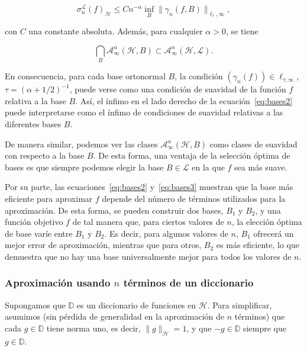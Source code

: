 \begin{equation}\label{eq:bases2}
    \sigma_n^{\mathcal{L}}(f)_{\mathcal{H}} \leq C n^{-\alpha} \inf_{B} \| \gamma_n(f, B) \|_{\ell_r, \infty},
\end{equation}

con $C$ una constante absoluta. Además, para cualquier $\alpha > 0$, se tiene

\begin{equation}\label{eq:bases3}
    \bigcap_{B} \mathcal{A}_\infty^\alpha (\mathcal{H}, B) \subset \mathcal{A}_\infty^\alpha (\mathcal{H}, \mathcal{L}).
\end{equation}

En consecuencia, para cada base ortonormal $B$, la condición $(\gamma_n(f)) \in \ell_{\tau, \infty}$, $\tau = (\alpha + 1/2)^{-1}$, puede verse como una condición de suavidad de la función $f$ relativa a la base $B$. Así, el ínfimo en el lado derecho de la ecuación~\eqref{eq:bases2} puede interpretarse como el ínfimo de condiciones de suavidad relativas a las diferentes bases $B$.

De manera similar, podemos ver las clases $\mathcal{A}_\infty^\alpha (\mathcal{H}, B)$ como clases de suavidad con respecto a la base $B$. De esta forma, una ventaja de la selección óptima de bases es que siempre podemos elegir la base $B \in \mathcal{L}$ en la que $f$ sea más suave.

Por su parte, las ecuaciones~\eqref{eq:bases2} y~\eqref{eq:bases3} muestran que la base más eficiente para aproximar $f$ depende del número de términos utilizados para la aproximación. De esta forma, se pueden construir dos bases, $B_1$ y $B_2$, y una función objetivo $f$ de tal manera que, para ciertos valores de $n$, la elección óptima de base varíe entre $B_1$ y $B_2$. Es decir, para algunos valores de $n$, $B_1$ ofrecerá un mejor error de aproximación, mientras que para otros, $B_2$ es más eficiente, lo que demuestra que no hay una base universalmente mejor para todos los valores de $n$.

\subsubsection{Aproximación usando $n$ términos de un diccionario}\label{subsubsec:approx-n-terms}

Supongamos que $\mathbb{D}$ es un diccionario de funciones en $\mathcal{H}$. Para simplificar, asumimos (sin pérdida de generalidad en la aproximación de $n$ términos) que cada $g \in \mathbb{D}$ tiene norma uno, es decir, $\|g\|_{\mathcal{H}} = 1$, y que $-g \in \mathbb{D}$ siempre que $g \in \mathbb{D}$.

